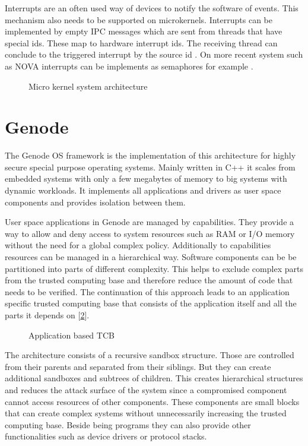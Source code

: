 \documentclass[
a4paper,
12pt,
notitlepage,
parskip=half,
DIV=11,
]{scrbook}
\begin{document}
		Interrupts are an often used way of devices to notify the software of events.
		This mechanism also needs to be supported on microkernels.
		Interrupts can be implemented by empty IPC messages which are sent from threads that have special ids.
		These map to hardware interrupt ids.
		The receiving thread can conclude to the triggered interrupt by the source id \citep{Liedtke_1995}.
		On more recent system such as NOVA interrupts can be implements as semaphores for example \citep{Steinberg:2010:NMS:1755913.1755935}.
		
		\begin{figure}
			\centering
			\def\svgwidth{0.8\textwidth}
			
			\caption{Micro kernel system architecture}
			\label{microkernel}    
		\end{figure}
		
		\section{Genode}
		
		The Genode OS framework is the implementation of this architecture for highly secure special purpose operating systems.
		Mainly written in C++ it scales from embedded systems with only a few megabytes of memory to big systems with dynamic workloads.
		It implements all applications and drivers as user space components and provides isolation between them.
		
		User space applications in Genode are managed by capabilities.
		They provide a way to allow and deny access to system resources such as RAM or I/O memory without the need for a global complex policy.
		Additionally to capabilities resources can be managed in a hierarchical way.
		Software components can be be partitioned into parts of different complexity.
		This helps to exclude complex parts from the trusted computing base and therefore reduce the amount of code that needs to be verified.
		The continuation of this approach leads to an application specific trusted computing base that consists of the application itself and all the parts it depends on [\ref{fig:tcb_tree}].
		\citep{genode}
		
		\begin{figure}
			\centering
			
			\caption{Application based TCB \citep{genode}}
			\label{fig:tcb_tree}
		\end{figure}
		
		The architecture consists of a recursive sandbox structure.
		Those are controlled from their parents and separated from their siblings.
		But they can create additional sandboxes and subtrees of children.
		This creates hierarchical structures and reduces the attack surface of the system since a compromised component cannot access resources of other components.
		These components are small blocks that can create complex systems without unnecessarily increasing the trusted computing base.
		Beside being programs they can also provide other functionalities such as device drivers or protocol stacks.
		
\end{document}
